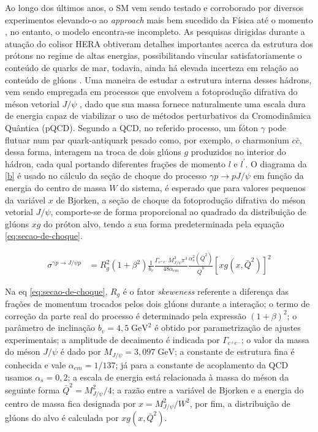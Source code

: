 \documentclass[11pt]{article}
\begin{document}
Ao longo dos últimos anos, o SM vem sendo testado e corroborado por diversos experimentos elevando-o ao \textit{approach} mais bem sucedido da Física até o momento \cite{GRIFFTHS:2008}, no entanto, o modelo encontra-se incompleto. As pesquisas dirigidas durante a atuação do colisor HERA obtiveram detalhes importantes acerca da estrutura dos prótons no regime de altas energias, possibilitando vincular satisfatoriamente o conteúdo de quarks de mar, todavia, ainda há elevada incerteza em relação ao conteúdo de glúons \cite{LUIS:2014}. Uma maneira de estudar a estrutura interna desses hádrons, vem sendo empregada em processos que envolvem a fotoprodução difrativa do méson vetorial $J/\psi$ \cite{RYSKIN:1996}, dado que sua massa fornece naturalmente uma escala dura de energia capaz de viabilizar o uso de métodos perturbativos da Cromodinâmica Quântica (pQCD). Segundo a QCD, no referido processo, um fóton $\gamma$ pode flutuar num par quark-antiquark pesado como, por exemplo, o charmonium $c\bar{c}$, dessa forma, interagem na troca de dois glúons $g$ produzidos no interior do hádron, cada qual portando diferentes frações de momento $l$ e $l^{\prime}$. O diagrama da \autoref{b} é usado no cálculo da seção de choque do processo $\gamma p\to pJ/\psi$ em função da energia do centro de massa $W$ do sistema, é esperado que para valores pequenos da variável $x$ de Bjorken, a seção de choque da fotoprodução difrativa do méson vetorial $J/\psi$, comporte-se de forma proporcional ao quadrado da distribuição de glúons $xg$ do próton alvo, tendo a sua forma predeterminada pela equação \eqref{eq:secao-de-choque}.

\begin{align}
	\sigma^{\gamma p\to J/\psi p} & = R_{g}^{2}(1+\beta^{2}) \frac{1}{b_{v}}\frac{\Gamma_{e^{+}e^{-}}M_{J/\psi}^{3} \pi^{3}}{48 \alpha_{em}}\frac{\alpha^{2}_{s}(\bar{Q}^{2})}{\bar{Q}^{8}}\left[xg(x,\bar{Q}^{2})\right]^{2}
	\label{eq:secao-de-choque}
\end{align}

Na eq \eqref{eq:secao-de-choque}, $R_{g}$ é o fator \textit{skeweness} referente a diferença das frações de momentum trocados pelos dois glúons durante a interação; o termo de correção da parte real do processo é determinado pela expressão $(1+\beta)^{2}$; o parâmetro de inclinação $b_{v}=4,5\;\textrm{GeV}^{2}$ é obtido por parametrização de ajustes experimentais; a amplitude de decaimento é indicada por $\Gamma_{e^{+}e^{-}}$; o valor da massa do méson $J/\psi$ é dado por $M_{J/\psi}=3,097\;\textrm{GeV}$; a constante de estrutura fina é conhecida e vale $\alpha_{em}=1/137$; já para a constante de acoplamento da QCD usamos $\alpha_{s}=0,2$; a escala de energia está relacionada à massa do méson da seguinte forma $\bar{Q}^{2}=M^{2}_{J/\psi}/4$; a razão entre a variável de Bjorken e a energia do centro de massa fica designada por $x=M_{J/\psi}^{2}/W^{2}$, por fim, a distribuição de glúons do alvo é calculada por $xg(x,\bar{Q}^{2})$.
\end{document}
